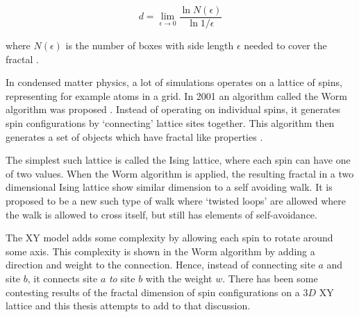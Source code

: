 \begin{equation}
    d = \lim_{\epsilon \to 0} \frac{\ln N(\epsilon)}{\ln 1 / \epsilon}
\end{equation}

where $N(\epsilon)$ is the number of boxes with side length $\epsilon$ needed to cover the fractal \cite{strogatz:dynamics_chaos}.

In condensed matter physics, a lot of simulations operates on a lattice of spins, representing for example atoms in a grid. In 2001 an algorithm called the Worm algorithm was proposed \cite{Prokofev:first_worm_algorithm}. Instead of operating on individual spins, it generates spin configurations by `connecting' lattice sites together. This algorithm then generates a set of objects which have fractal like properties \cite{Duplantier:GeoHausdorff}.

The simplest such lattice is called the Ising lattice, where each spin can have one of two values. When the Worm algorithm is applied, the resulting fractal in a two dimensional Ising lattice show similar dimension to a self avoiding walk. It is proposed to be a new such type of walk where `twisted loops' are allowed where the walk is allowed to cross itself, but still has elements of self-avoidance.

The XY model adds some complexity by allowing each spin to rotate around some axis. This complexity is shown in the Worm algorithm by adding a direction and weight to the connection. Hence, instead of connecting site $a$ and site $b$, it connects site $a$ \textit{to} site $b$ with the weight $w$. There has been some contesting results of the fractal dimension of spin configurations on a $3D$ XY lattice \cite{Prokofev:comment_on_hove_hausdorff_crit_fluct}\cite{Hove:hausdorff_crit_fluctuations} and this thesis attempts to add to that discussion. 













